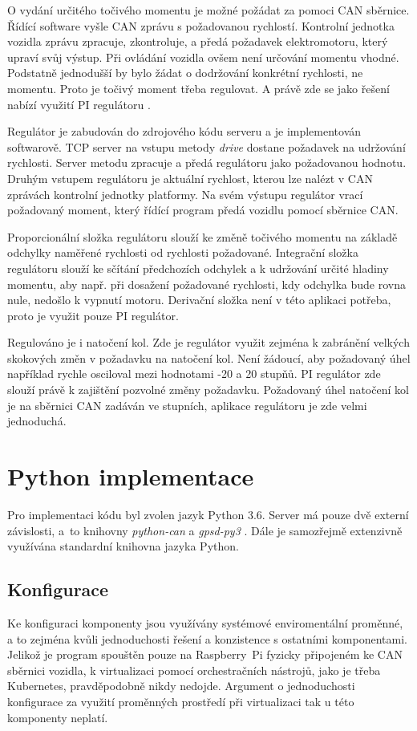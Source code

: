 \documentclass[czech, bachelor]{diploma}
\begin{document}
O vydání určitého točivého momentu je možné požádat za pomoci CAN sběrnice. Řídící software vyšle CAN zprávu s požadovanou
rychlostí. Kontrolní jednotka vozidla zprávu zpracuje, zkontroluje, a předá požadavek elektromotoru, který upraví svůj výstup.
Při ovládání vozidla ovšem není určování momentu vhodné. Podstatně jednodušší by bylo žádat o dodržování konkrétní rychlosti,
ne momentu. Proto je točivý moment třeba regulovat. A právě zde se jako řešení nabízí využití PI regulátoru
\cite{pid-controller-source}.

Regulátor je zabudován do zdrojového kódu serveru a je implementován softwarově. TCP server na vstupu metody \emph{drive} dostane
požadavek na udržování rychlosti. Server metodu zpracuje a předá regulátoru jako požadovanou hodnotu. Druhým vstupem regulátoru
je aktuální rychlost, kterou lze nalézt v CAN zprávách kontrolní jednotky platformy. Na svém výstupu regulátor vrací požadovaný
moment, který řídící program předá vozidlu pomocí sběrnice CAN.

Proporcionální složka regulátoru slouží ke změně točivého momentu na základě odchylky naměřené rychlosti od rychlosti požadované.
Integrační složka regulátoru slouží ke sčítání předchozích odchylek a k udržování určité hladiny momentu, aby např. při dosažení
požadované rychlosti, kdy odchylka bude rovna nule, nedošlo k vypnutí motoru. Derivační složka není v této aplikaci potřeba, proto
je využit pouze PI regulátor.

Regulováno je i natočení kol. Zde je regulátor využit zejména k zabránění velkých skokových změn v požadavku na natočení kol. Není
žádoucí, aby požadovaný úhel například rychle osciloval mezi hodnotami -20 a 20 stupňů. PI regulátor zde slouží právě k zajištění
pozvolné změny požadavku. Požadovaný úhel natočení kol je na sběrnici CAN zadáván ve stupních, aplikace regulátoru je zde velmi
jednoduchá.

\section{Python implementace}

Pro implementaci kódu byl zvolen jazyk Python 3.6. Server má pouze dvě externí závislosti, a~to knihovny \emph{python-can}
a \cite{python-can-source} \emph{gpsd-py3} \cite{gpsd-py3-source}. Dále je samozřejmě extenzivně využívána standardní knihovna
jazyka Python.

\subsection{Konfigurace}
Ke konfiguraci komponenty jsou využívány systémové enviromentální proměnné, a to zejména kvůli jednoduchosti řešení a konzistence
s ostatními komponentami. Jelikož je program spouštěn pouze na Raspberry~Pi fyzicky připojeném ke CAN sběrnici vozidla,
k virtualizaci pomocí orchestračních nástrojů, jako je třeba Kubernetes, pravděpodobně nikdy nedojde. Argument o jednoduchosti
konfigurace za využití proměnných prostředí při virtualizaci tak u této komponenty neplatí.
\end{document}
